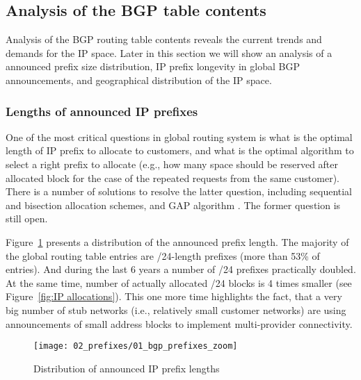 \subsection{Analysis of the BGP table contents}

Analysis of the BGP routing table contents reveals the current trends and
demands for the IP space. Later in this section we will show an analysis of a
announced prefix size distribution, IP prefix longevity in global BGP
announcements, and geographical distribution of the IP space.

\subsubsection{Lengths of announced IP prefixes}

One of the most critical questions in global routing system is what is the
optimal length of IP prefix to allocate to customers, and what is the optimal
algorithm to select a right prefix to allocate (e.g., how many space should be
reserved after allocated block for the case of the repeated requests from the
same customer). There is a number of solutions to resolve the latter question,
including sequential and bisection allocation schemes, and GAP algorithm
\cite{Wang:2007:Reduce-IP-Address}. The former question is still open.

Figure~\ref{fig:bgp prefix distribution} presents a distribution of the
announced prefix length. The majority of the global routing table entries are
/24-length prefixes (more than 53\% of entries). And during the last 6 years a
number of /24 prefixes practically doubled. At the same time, number of
actually allocated /24 blocks is 4 times smaller (see Figure~\ref{fig:IP
allocations}). This one more time highlights the fact, that a very big number
of stub networks (i.e., relatively small customer networks) are using
announcements of small address blocks to implement multi-provider
connectivity.

\begin{figure}[htbp]
	\centering
		\texttt{[image: 02\_prefixes/01\_bgp\_prefixes\_zoom]}
	\caption{Distribution of announced IP prefix lengths}
	\label{fig:bgp prefix distribution}
\end{figure}

